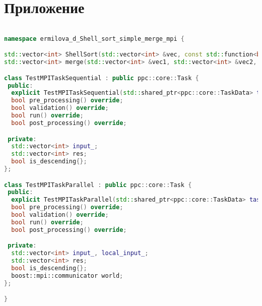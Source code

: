 \documentclass[a4paper,12pt]{article}
\begin{document}
\section{Приложение}
\begin{lstlisting}[language=C++,caption={заголовочный файл параллельной версии}]

namespace ermilova_d_Shell_sort_simple_merge_mpi {

std::vector<int> ShellSort(std::vector<int> &vec, const std::function<bool(int, int)> &comp);
std::vector<int> merge(std::vector<int> &vec1, std::vector<int> &vec2, const std::function<bool(int, int)> &comp);

class TestMPITaskSequential : public ppc::core::Task {
 public:
  explicit TestMPITaskSequential(std::shared_ptr<ppc::core::TaskData> taskData_) : Task(std::move(taskData_)) {}
  bool pre_processing() override;
  bool validation() override;
  bool run() override;
  bool post_processing() override;

 private:
  std::vector<int> input_;
  std::vector<int> res;
  bool is_descending{};
};

class TestMPITaskParallel : public ppc::core::Task {
 public:
  explicit TestMPITaskParallel(std::shared_ptr<ppc::core::TaskData> taskData_) : Task(std::move(taskData_)) {}
  bool pre_processing() override;
  bool validation() override;
  bool run() override;
  bool post_processing() override;

 private:
  std::vector<int> input_, local_input_;
  std::vector<int> res;
  bool is_descending{};
  boost::mpi::communicator world;
};

}  
\end{lstlisting}
\end{document}
